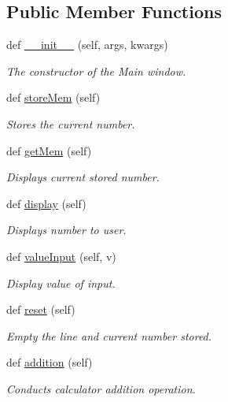 \subsection*{Public Member Functions}
\begin{DoxyCompactItemize}
\item 
def \hyperlink{classmain_1_1_main_window_aafffd1d8e8955b1e04e531ad7f534b69}{\+\_\+\+\_\+init\+\_\+\+\_\+} (self, args, kwargs)
\begin{DoxyCompactList}\small\item\em The constructor of the Main window. \end{DoxyCompactList}\item 
def \hyperlink{classmain_1_1_main_window_a0888a2f2c8cd534806ea385502f1a67b}{store\+Mem} (self)
\begin{DoxyCompactList}\small\item\em Stores the current number. \end{DoxyCompactList}\item 
def \hyperlink{classmain_1_1_main_window_a77d526c3d373219cdd6d6d0437ac3660}{get\+Mem} (self)
\begin{DoxyCompactList}\small\item\em Displays current stored number. \end{DoxyCompactList}\item 
def \hyperlink{classmain_1_1_main_window_a86f6db688a227bf7a9228ef5ab650d31}{display} (self)
\begin{DoxyCompactList}\small\item\em Displays number to user. \end{DoxyCompactList}\item 
def \hyperlink{classmain_1_1_main_window_a8d41e3c99603b99d23073aeea7d01534}{value\+Input} (self, v)
\begin{DoxyCompactList}\small\item\em Display value of input. \end{DoxyCompactList}\item 
def \hyperlink{classmain_1_1_main_window_a8e489d6d240a339dceb8258429fe1fc9}{reset} (self)
\begin{DoxyCompactList}\small\item\em Empty the line and current number stored. \end{DoxyCompactList}\item 
def \hyperlink{classmain_1_1_main_window_ad3673a13020c18149857ca57cbd13303}{addition} (self)
\begin{DoxyCompactList}\small\item\em Conducts calculator addition operation. \end{DoxyCompactList}\item 

\end{DoxyCompactItemize}
